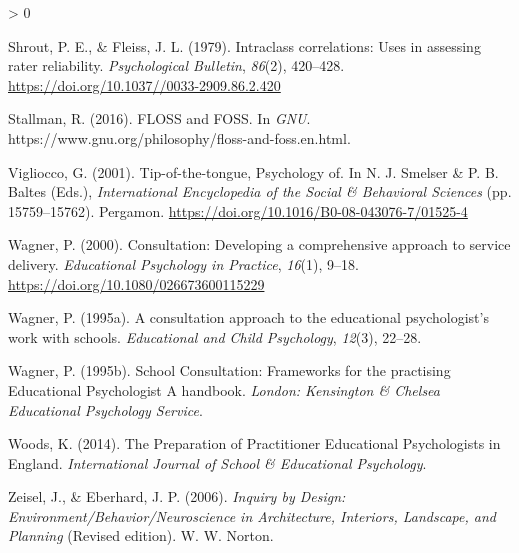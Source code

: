\documentclass[
  english,
  man]{apa}
\newlength{\cslhangindent}
\newenvironment{CSLReferences}[2] %
 {%
  \setlength{\parindent}{0pt}
  \ifodd #1 \everypar{\setlength{\hangindent}{\cslhangindent}}\ignorespaces\fi
  \ifnum #2 > 0
  \setlength{\parskip}{#2\baselineskip}
  \fi
 }%
 {}
\begin{document}
\begin{CSLReferences}{1}{0}
\leavevmode\hypertarget{ref-shroutIntraclassCorrelationsUses1979}{}%
Shrout, P. E., \& Fleiss, J. L. (1979). Intraclass correlations: Uses in assessing rater reliability. \emph{Psychological Bulletin}, \emph{86}(2), 420--428. \url{https://doi.org/10.1037//0033-2909.86.2.420}

\leavevmode\hypertarget{ref-stallmanFLOSSFOSS2016}{}%
Stallman, R. (2016). {FLOSS} and {FOSS}. In \emph{GNU}. https://www.gnu.org/philosophy/floss-and-foss.en.html.

\leavevmode\hypertarget{ref-viglioccoTipofthetonguePsychology2001}{}%
Vigliocco, G. (2001). Tip-of-the-tongue, {Psychology} of. In N. J. Smelser \& P. B. Baltes (Eds.), \emph{International {Encyclopedia} of the {Social} \& {Behavioral Sciences}} (pp. 15759--15762). {Pergamon}. \url{https://doi.org/10.1016/B0-08-043076-7/01525-4}

\leavevmode\hypertarget{ref-wagnerConsultationDevelopingComprehensive2000}{}%
Wagner, P. (2000). Consultation: {Developing} a comprehensive approach to service delivery. \emph{Educational Psychology in Practice}, \emph{16}(1), 9--18. \url{https://doi.org/10.1080/026673600115229}

\leavevmode\hypertarget{ref-wagnerConsultationApproachEducational1995}{}%
Wagner, P. (1995a). A consultation approach to the educational psychologist's work with schools. \emph{Educational and Child Psychology}, \emph{12}(3), 22--28.

\leavevmode\hypertarget{ref-wagnerSchoolConsultationFrameworks1995}{}%
Wagner, P. (1995b). School {Consultation}: Frameworks for the practising {Educational Psychologist A} handbook. \emph{London: Kensington \& Chelsea Educational Psychology Service}.

\leavevmode\hypertarget{ref-woodsPreparationPractitionerEducational2014}{}%
Woods, K. (2014). The {Preparation} of {Practitioner Educational Psychologists} in {England}. \emph{International Journal of School \& Educational Psychology}.

\leavevmode\hypertarget{ref-zeiselInquiryDesignEnvironment2006}{}%
Zeisel, J., \& Eberhard, J. P. (2006). \emph{Inquiry by {Design}: {Environment}/{Behavior}/{Neuroscience} in {Architecture}, {Interiors}, {Landscape}, and {Planning}} (Revised edition). {W. W. Norton}.

\end{CSLReferences}

\endgroup
\end{document}
